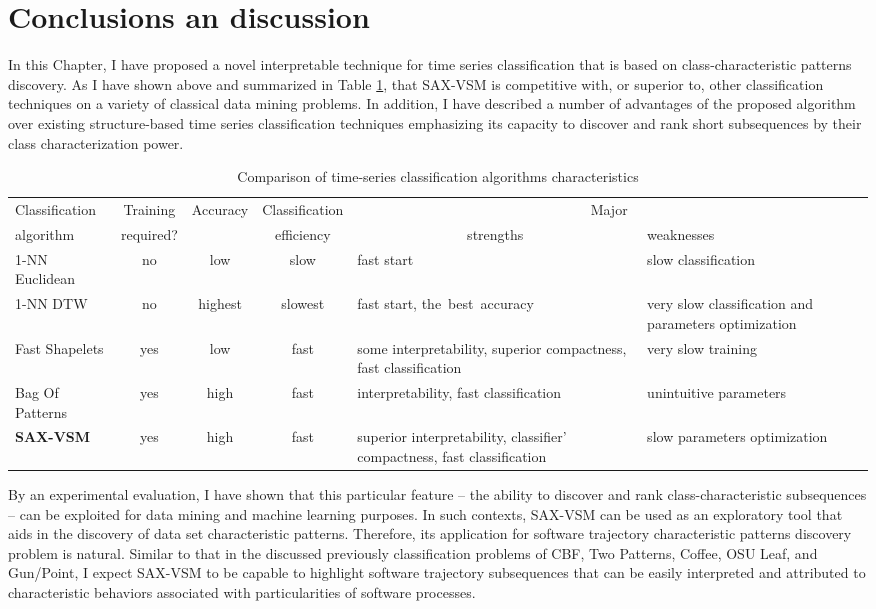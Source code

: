 \section{Conclusions an discussion} \label{conclusion}
In this Chapter, I have proposed a novel interpretable technique for time series classification that is based on class-characteristic patterns discovery. As I have shown above and summarized in Table \ref{saxvsm_table2}, that SAX-VSM is competitive with, or superior to, other classification techniques on a variety of classical data mining problems. In addition, I have described a number of advantages of the proposed algorithm over existing structure-based time series classification techniques emphasizing its capacity to discover and rank short subsequences by their class characterization power. 
\begin{table}[t]
\caption{Comparison of time-series classification algorithms characteristics}
\label{saxvsm_table2}
\centering
\begin{small}
\begin{tabularx}{\linewidth}{| l | c | c | c | X | X |}
\hline
Classification & Training & Accuracy & Classification & \multicolumn{2}{c|}{Major} \\
algorithm & required? & & efficiency & \multicolumn{1}{c}{strengths} & weaknesses \\
\hline
1-NN Euclidean & no & low & slow & fast start & slow classification \\
\hline
1-NN DTW & no & highest & slowest & fast start, \mbox{the best accuracy} &  very slow classification and parameters optimization \\
\hline
Fast Shapelets & yes & low & fast & some interpretability, superior compactness, fast classification & very slow training \\
\hline
Bag Of Patterns & yes & high & fast & interpretability, fast classification & unintuitive parameters \\
\hline
\textbf{SAX-VSM} & yes & high & fast & superior interpretability, classifier' compactness, fast classification & slow parameters optimization\\ 
\hline
\end{tabularx}
\end{small}
\end{table}

By an experimental evaluation, I have shown that this particular feature -- the ability to discover and rank class-characteristic subsequences -- can be exploited for data mining and machine learning purposes. In such contexts, SAX-VSM can be used as an 
exploratory tool that aids in the discovery of data set characteristic patterns. Therefore, its application for software trajectory characteristic patterns discovery problem is natural. Similar to that in the discussed previously classification problems of CBF, Two Patterns, Coffee, OSU Leaf, and Gun/Point, I expect SAX-VSM to be capable to highlight software trajectory subsequences that can be easily interpreted and attributed to characteristic behaviors associated with particularities of software processes.

